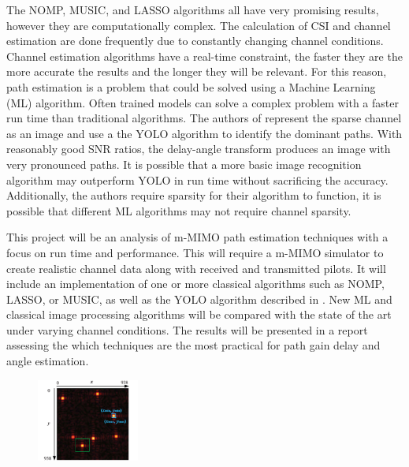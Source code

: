 The NOMP, MUSIC, and LASSO algorithms all have very promising results, however they are computationally complex. The calculation of CSI and channel estimation are done frequently due to constantly changing channel conditions. Channel estimation algorithms have a real-time constraint, the faster they are the more accurate the results and the longer they will be relevant. For this reason, path estimation is a problem that could be solved using a Machine Learning (ML) algorithm. Often trained models can solve a complex problem with a faster run time than traditional algorithms. The authors of \cite{Li2020} represent the sparse channel as an image and use a the YOLO algorithm to identify the dominant paths. With reasonably good SNR ratios, the delay-angle transform produces an image with very pronounced paths. It is possible that a more basic image recognition algorithm may outperform YOLO in run time without sacrificing the accuracy. Additionally, the authors require sparsity for their algorithm to function, it is possible that different ML algorithms may not require channel sparsity. 

This project will be an analysis of m-MIMO path estimation techniques with a focus on run time and performance. This will require a m-MIMO simulator to create realistic channel data along with received and transmitted pilots. It
will include an implementation of one or more classical algorithms such as NOMP, LASSO, or MUSIC, as well as the YOLO algorithm described in \cite{Li2020}. New ML and classical image processing algorithms will be compared with the state of the art under varying channel conditions. The results will be presented in a report assessing the which techniques are the most practical for path gain delay and angle estimation.

\iffalse
\begin{figure}
    \centering
    \includegraphics[width=0.3\textwidth]{YOLO.png}
\end{figure}


